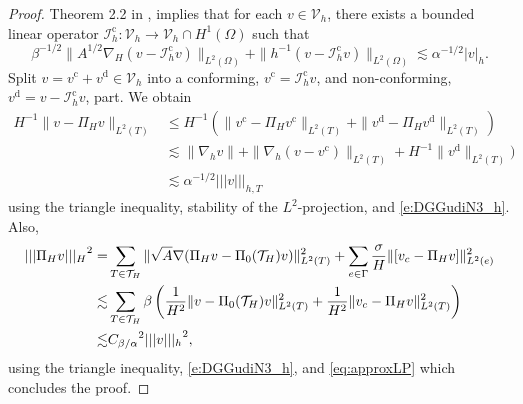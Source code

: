 \documentclass[10pt]{article}
\numberwithin{equation}{section}
\theoremstyle{plain}
\theoremstyle{definition}
\theoremstyle{remark}
\begin{document}
\begin{proof}
  Theorem 2.2 in \cite{Karakashian2003}, implies that for each $v\in {\mathcal{V}_h}$, there exists a bounded linear operator ${\mathcal{I}^{\operatorname*{c}}_h}:{\mathcal{V}_h}\rightarrow{\mathcal{V}_h}\cap H^1(\Omega)$ such that
\begin{equation}\label{e:DGGudiN3_h}
  {\beta}^{-1/2}\|{A}^{1/2}\nabla_H(v-{\mathcal{I}^{\operatorname*{c}}_h} v)\|_{L^2(\Omega)} + \|h^{-1}(v-{\mathcal{I}^{\operatorname*{c}}_h} v)\|_{L^2(\Omega)}\lesssim {\alpha}^{-1/2} |v|_h.
\end{equation}  
Split $v=v^{\operatorname*{c}}+v^{\operatorname*{d}}\in{\mathcal{V}}_h$ into a conforming, $v^{\operatorname*{c}}={\mathcal{I}^{\operatorname*{c}}_h} v$, and non-conforming, $v^{\operatorname*{d}}=v-{\mathcal{I}^{\operatorname*{c}}_h} v$, part. We obtain
  \begin{equation}\label{eq:approxLP}
    \begin{aligned}
      H^{-1}\|v-{\Pi_H} v\|_{L^2(T)} &\leq H^{-1}(\|v^{\operatorname*{c}}-{\Pi_H} v^{\operatorname*{c}}\|_{L^2(T)}+\|v^{\operatorname*{d}}-{\Pi_H} v^{\operatorname*{d}}\|_{L^2(T)}) \\
      & \lesssim \|\nabla_h v\| +\|\nabla_h(v-v^{\operatorname*{c}})\|_{L^2(T)} + H^{-1}\|v^{\operatorname*{d}}\|_{L^2(T)}) \\
      & \lesssim {\alpha}^{-1/2}{||| {v} |||_{h,{T}}}
    \end{aligned}      
  \end{equation}
  using the triangle inequality, stability of the $L^2$-projection, and \eqref{e:DGGudiN3_h}.
  Also,
  \begin{equation}\notag
    \begin{aligned}
      {||| {{\Pi_H} v} |||_H}^2 =& \sum_{T\in{\mathcal{T}}_H}\|\sqrt{A}\nabla ({\Pi_H} v -\Pi_0({\mathcal{T}}_H)v)\|^2_{L^2(T)}+\sum_{e\in\Gamma}\frac{\sigma}{H}\|[v_c-{\Pi_H} v]\|^2_{L^2(e)} \\
       \lesssim& \sum_{T\in{\mathcal{T}}_H}{\beta}\left(\frac{1}{H^2}\|v-\Pi_0({\mathcal{T}}_H)v\|^2_{L^2(T)}+\frac{1}{H^2}\|v_c-{\Pi_H} v\|^2_{L^2(T)}\right)\\
      \lesssim & {C_{{\beta}/{\alpha}}}^2{||| {v} |||_h}^2,
    \end{aligned}
  \end{equation}
using the triangle inequality, \eqref{e:DGGudiN3_h}, and \eqref{eq:approxLP} which concludes the proof.
\end{proof}
\end{document}
